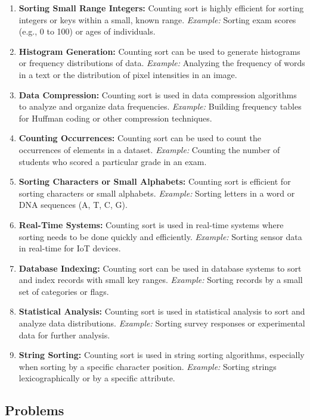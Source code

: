 \begin{enumerate}
    \item \textbf{Sorting Small Range Integers:} Counting sort is highly efficient for sorting integers or keys within a small, known range. \textit{Example:} Sorting exam scores (e.g., 0 to 100) or ages of individuals.
    \item \textbf{Histogram Generation:} Counting sort can be used to generate histograms or frequency distributions of data. \textit{Example:} Analyzing the frequency of words in a text or the distribution of pixel intensities in an image.
    \item \textbf{Data Compression:} Counting sort is used in data compression algorithms to analyze and organize data frequencies. \textit{Example:} Building frequency tables for Huffman coding or other compression techniques.
    \item \textbf{Counting Occurrences:} Counting sort can be used to count the occurrences of elements in a dataset. \textit{Example:} Counting the number of students who scored a particular grade in an exam.
    \item \textbf{Sorting Characters or Small Alphabets:} Counting sort is efficient for sorting characters or small alphabets. \textit{Example:} Sorting letters in a word or DNA sequences (A, T, C, G).
    \item \textbf{Real-Time Systems:} Counting sort is used in real-time systems where sorting needs to be done quickly and efficiently. \textit{Example:} Sorting sensor data in real-time for IoT devices.
    \item \textbf{Database Indexing:} Counting sort can be used in database systems to sort and index records with small key ranges. \textit{Example:} Sorting records by a small set of categories or flags.
    \item \textbf{Statistical Analysis:} Counting sort is used in statistical analysis to sort and analyze data distributions. \textit{Example:} Sorting survey responses or experimental data for further analysis.
    \item \textbf{String Sorting:} Counting sort is used in string sorting algorithms, especially when sorting by a specific character position. \textit{Example:} Sorting strings lexicographically or by a specific attribute.
\end{enumerate}

\subsection{Problems}

